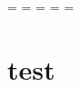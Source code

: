 	

	
	
	
    \endgroup
	\newpage
	\paperwidth=\pdfpageheight
	\paperheight=\pdfpagewidth
	\pdfpageheight=\paperheight
	\pdfpagewidth=\paperwidth
	\headwidth=\textwidth
	
	\section{test}
	\getlength{\paperwidth}\\
	\getlength{\paperheight}\\
	\getlength{\pdfpageheight}\\
	\getlength{\pdfpagewidth}\\
	\getlength{\headwidth}\\
	\getlength{\footskip}\\
	\getlength{\textwidth}\\
	\getlength{\textheight}\\
	\getlength{\vsize}\\
	\getlength{\hsize}\\